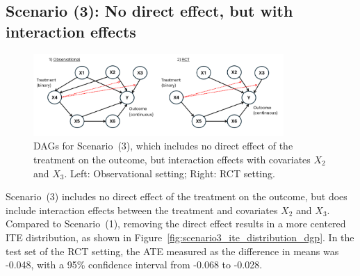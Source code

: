 \clearpage 



\subsection{Scenario (3): No direct effect, but with interaction effects}

\begin{figure}[H]
\centering
\includegraphics[width=0.85\textwidth]{img/exp4_dag_3.png}
\caption{DAGs for Scenario~(3), which includes no direct effect of the treatment on the outcome, but interaction effects with covariates $X_2$ and $X_3$. Left: Observational setting; Right: RCT setting.}
\label{fig:ite_dag_observational_3}
\end{figure}

Scenario~(3) includes no direct effect of the treatment on the outcome, but does include interaction effects between the treatment and covariates $X_2$ and $X_3$. Compared to Scenario~(1), removing the direct effect results in a more centered ITE distribution, as shown in Figure~\ref{fig:scenario3_ite_distribution_dgp}. In the test set of the RCT setting, the ATE measured as the difference in means was -0.048, with a 95\% confidence interval from -0.068 to -0.028.





